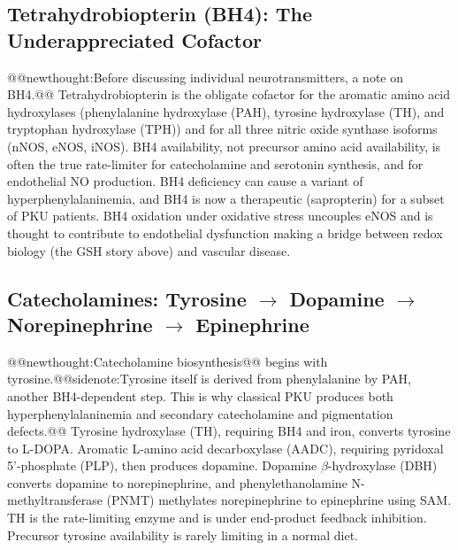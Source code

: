 \documentclass{tufte-handout}
\makeatletter
\def\newthought#1{@@newthought:#1@@}
\def\sidenote#1{@@sidenote:#1@@}
\makeatother
\begin{document}
\subsection{Tetrahydrobiopterin (BH4): The Underappreciated Cofactor}
\newthought{Before discussing individual neurotransmitters, a note on BH4.} Tetrahydrobiopterin is the obligate cofactor for the aromatic amino acid hydroxylases (phenylalanine hydroxylase (PAH), tyrosine hydroxylase (TH), and tryptophan hydroxylase (TPH)) and for all three nitric oxide synthase isoforms (nNOS, eNOS, iNOS). BH4 availability, not precursor amino acid availability, is often the true rate-limiter for catecholamine and serotonin synthesis, and for endothelial NO production. BH4 deficiency can cause a variant of hyperphenylalaninemia, and BH4 is now a therapeutic (sapropterin) for a subset of PKU patients. BH4 oxidation under oxidative stress uncouples eNOS and is thought to contribute to endothelial dysfunction making a bridge between redox biology (the GSH story above) and vascular disease.

\subsection{Catecholamines: Tyrosine \texorpdfstring{$\rightarrow$}{->} Dopamine \texorpdfstring{$\rightarrow$}{->} Norepinephrine \texorpdfstring{$\rightarrow$}{->} Epinephrine}
\newthought{Catecholamine biosynthesis} begins with tyrosine.\sidenote{Tyrosine itself is derived from phenylalanine\index{Amino Acids!Phenylalanine} by PAH, another BH4-dependent step. This is why classical PKU produces both hyperphenylalaninemia and secondary catecholamine and pigmentation defects.} Tyrosine hydroxylase (TH), requiring BH4 and iron, converts tyrosine to L-DOPA. Aromatic L-amino acid decarboxylase (AADC), requiring pyridoxal 5'-phosphate (PLP), then produces dopamine. Dopamine $\beta$-hydroxylase (DBH) converts dopamine to norepinephrine, and phenylethanolamine N-methyltransferase (PNMT) methylates norepinephrine to epinephrine using SAM. TH is the rate-limiting enzyme and is under end-product feedback inhibition. Precursor tyrosine availability is rarely limiting in a normal diet.
\end{document}
